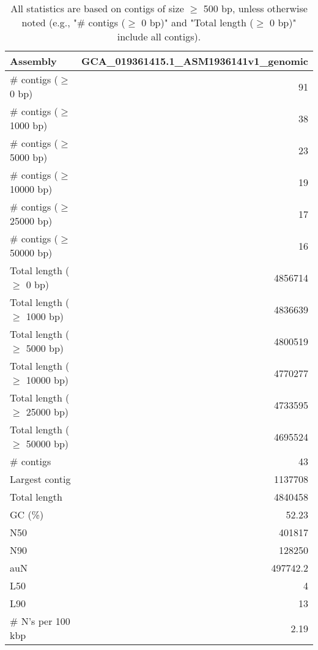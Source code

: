 \documentclass[12pt,a4paper]{article}
\begin{document}
\begin{table}[ht]
\begin{center}
\caption{All statistics are based on contigs of size $\geq$ 500 bp, unless otherwise noted (e.g., "\# contigs ($\geq$ 0 bp)" and "Total length ($\geq$ 0 bp)" include all contigs).}
\begin{tabular}{|l*{1}{|r}|}
\hline
Assembly & GCA\_019361415.1\_ASM1936141v1\_genomic \\ \hline
\# contigs ($\geq$ 0 bp) & 91 \\ \hline
\# contigs ($\geq$ 1000 bp) & 38 \\ \hline
\# contigs ($\geq$ 5000 bp) & 23 \\ \hline
\# contigs ($\geq$ 10000 bp) & 19 \\ \hline
\# contigs ($\geq$ 25000 bp) & 17 \\ \hline
\# contigs ($\geq$ 50000 bp) & 16 \\ \hline
Total length ($\geq$ 0 bp) & 4856714 \\ \hline
Total length ($\geq$ 1000 bp) & 4836639 \\ \hline
Total length ($\geq$ 5000 bp) & 4800519 \\ \hline
Total length ($\geq$ 10000 bp) & 4770277 \\ \hline
Total length ($\geq$ 25000 bp) & 4733595 \\ \hline
Total length ($\geq$ 50000 bp) & 4695524 \\ \hline
\# contigs & 43 \\ \hline
Largest contig & 1137708 \\ \hline
Total length & 4840458 \\ \hline
GC (\%) & 52.23 \\ \hline
N50 & 401817 \\ \hline
N90 & 128250 \\ \hline
auN & 497742.2 \\ \hline
L50 & 4 \\ \hline
L90 & 13 \\ \hline
\# N's per 100 kbp & 2.19 \\ \hline
\end{tabular}
\end{center}
\end{table}
\end{document}
